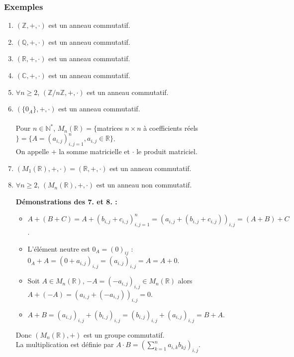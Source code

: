 \documentclass[a4paper,10pt]{book} %
\newcommand{\R}{\mathbb{R}}
\newcommand{\N}{\mathbb{N}}
\newcommand{\Z}{\mathbb{Z}}
\newcommand{\C}{\mathbb{C}}
\newcommand{\Q}{\mathbb{Q}}
\begin{document}
\subsubsection{Exemples}
\begin{enumerate}
\item $(\Z,+,\cdot)$ est un anneau commutatif.\smallskip
\item $(\Q,+,\cdot)$ est un anneau commutatif.\smallskip
\item $(\R,+,\cdot)$ est un anneau commutatif.\smallskip
\item $(\C,+,\cdot)$ est un anneau commutatif.\smallskip
\item $\forall n\geq 2$, $(\Z/n\Z, +,\cdot)$ est un anneau commutatif.\smallskip
\item $(\{0_A\},+,\cdot)$ est un anneau commutatif.\smallskip\\\\

Pour $n\in\N^*$, $M_n(\R)=\{$matrices $n\times n$ à coefficients réels$\}=\{A=(a_{i,j})^n_{i,j=1}, a_{i,j}\in\R \}$.\\
On appelle $+$ la somme matricielle et $\cdot$ le produit matriciel.\smallskip

\item $(M_1(\R),+,\cdot)=(\R,+,\cdot)$ est un anneau commutatif.\smallskip
\item $\forall n\geq 2$, $(M_n(\R),+,\cdot)$ est un anneau non commutatif.\\

\newpage

\textbf{Démonstrations des 7. et 8. : }

\begin{itemize}
\item $A+(B+C)=A+(b_{i,j}+c_{i,j})_{i,j=1}^n=(a_{i,j}+ (b_{i,j}+ c_{i,j}))_{i,j}=(A+B)+C$.
\item L'élément neutre est $0_A=(0)_{ij}$ : $0_A+A=(0+a_{i,j})_{i,j}=(a_{i,j})_{i,j}=A=A+0$.
\item Soit $A\in M_n(\R)$, $-A=(-a_{i,j})_{i,j}\in M_n(\R)$ alors $A+(-A)=(a_{i,j}+(-a_{i,j}))_{i,j}=0$.
\item $A+B=(a_{i,j})_{i,j}+(b_{i,j})_{i,j}=(b_{i,j})_{i,j}+ (a_{i,j})_{i,j}=B+A$.
\end{itemize}
Donc $(M_n(\R),+)$ est un groupe commutatif.\\

La multiplication est définie par $\displaystyle A\cdot B=(\sum_{k=1}^na_{i,k}b_{kj})_{i,j}$.


\end{enumerate}
\end{document}
